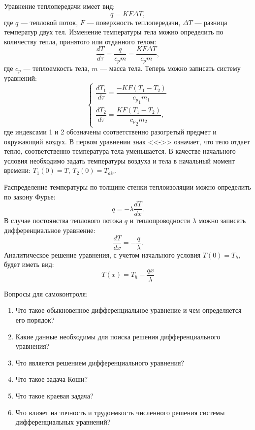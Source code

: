 Уравнение теплопередачи имеет вид:
\begin{equation}
q=K F \Delta T,
\end{equation}
где $q$ --- тепловой поток, $F$ --- поверхность теплопередачи, $\Delta T$ --- разница температур двух тел. Изменение температуры тела можно определить по количеству тепла, принятого или отданного телом:
\begin{equation}
\dfrac{d T}{d \tau}=\dfrac{q}{c_p m} = \dfrac{K F \Delta T}{c_p m},
\end{equation}
где $c_p$ --- теплоемкость тела, $m$ --- масса тела.
Теперь можно записать систему уравнений:
\begin{equation}
\begin{cases}
\dfrac{d T_1}{d \tau} = \dfrac{-K F (T_1-T_2)}{{c_p}_1 m_1} \\
\dfrac{d T_2}{d \tau} = \dfrac{K F (T_1-T_2)}{{c_p}_2 m_2},
\end{cases}
\end{equation}
где индексами 1 и 2 обозначены соответственно разогретый предмет и окружающий воздух. В первом уравнении знак <<->> означает, что тело отдает тепло, соответственно температура тела уменьшается. В качестве начального условия необходимо задать температуры воздуха и тела в начальный момент времени: $T_1(0) = T$, $T_2(0) = T_{air}$.


Распределение температуры по толщине стенки теплоизоляции можно определить по закону Фурье:
\begin{equation}
q=-\lambda \dfrac{d T}{d x}.
\end{equation} 
В случае постоянства теплового потока $q$ и теплопроводности $\lambda$ можно записать дифференциальное уравнение:
\begin{equation}
\dfrac{d T}{d x} =- \dfrac{q}{\lambda}.
\end{equation}
Аналитическое решение уравнения, с учетом начального условия $T(0) = T_h$, будет иметь вид:
\begin{equation}
T(x) = T_h - \dfrac{q x}{\lambda}
\end{equation}

Вопросы для самоконтроля:
\begin{enumerate}
	\item Что такое обыкновенное дифференциальное уравнение и чем определяется его порядок?
	\item Какие данные необходимы для поиска решения дифференциального уравнения?
	\item Что является решением дифференциального уравнения?
	\item Что такое задача Коши?
	\item Что такое краевая задача?
	\item Что влияет на точность и трудоемкость численного решения системы дифференциальных уравнений?
\end{enumerate}

